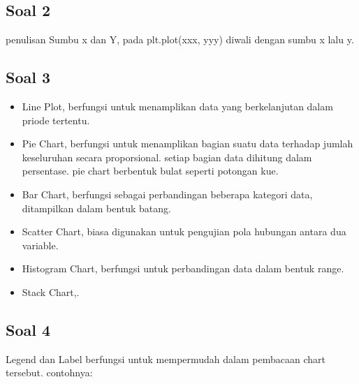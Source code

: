 \subsection{Soal 2}
penulisan Sumbu x dan Y, pada plt.plot(xxx, yyy) diwali dengan sumbu x lalu y.



\subsection{Soal 3}
\begin{itemize}
	\item Line Plot, berfungsi untuk menamplikan data yang berkelanjutan dalam priode tertentu.
	
	
	\item Pie Chart, berfungsi untuk menamplikan bagian suatu data terhadap jumlah keseluruhan secara proporsional. 	setiap bagian data dihitung dalam persentase. pie chart berbentuk bulat seperti potongan kue.
	
	
	\item Bar Chart, berfungsi sebagai perbandingan beberapa kategori data, ditampilkan dalam bentuk batang.
	
	
	\item Scatter Chart, biasa digunakan untuk pengujian pola hubungan antara dua variable.
	
	
	\item Histogram Chart, berfungsi untuk perbandingan data dalam bentuk range.
	
	
	\item Stack Chart,.
			
\end{itemize}

\subsection{Soal 4}
Legend dan Label berfungsi untuk mempermudah dalam pembacaan chart tersebut. contohnya:


